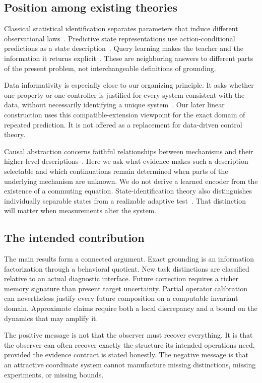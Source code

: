 \subsection{Position among existing theories}
Classical statistical identification separates parameters that induce different observational laws~\cite{GA:rothenberg}. Predictive state representations use action-conditional predictions as a state description~\cite{GA:psr}. Query learning makes the teacher and the information it returns explicit~\cite{GA:angluin}. These are neighboring answers to different parts of the present problem, not interchangeable definitions of grounding.

Data informativity is especially close to our organizing principle. It asks whether one property or one controller is justified for every system consistent with the data, without necessarily identifying a unique system~\cite{GA:informativity}. Our later linear construction uses this compatible-extension viewpoint for the exact domain of repeated prediction. It is not offered as a replacement for data-driven control theory.

Causal abstraction concerns faithful relationships between mechanisms and their higher-level descriptions~\cite{GA:causal}. Here we ask what evidence makes such a description selectable and which continuations remain determined when parts of the underlying mechanism are unknown. We do not derive a learned encoder from the existence of a commuting equation. State-identification theory also distinguishes individually separable states from a realizable adaptive test~\cite{GA:stateid}. That distinction will matter when measurements alter the system.

\subsection{The intended contribution}
The main results form a connected argument. Exact grounding is an information factorization through a behavioral quotient. New task distinctions are classified relative to an actual diagnostic interface. Future correction requires a richer memory signature than present target uncertainty. Partial operator calibration can nevertheless justify every future composition on a computable invariant domain. Approximate claims require both a local discrepancy and a bound on the dynamics that may amplify it.

The positive message is not that the observer must recover everything. It is that the observer can often recover exactly the structure its intended operations need, provided the evidence contract is stated honestly. The negative message is that an attractive coordinate system cannot manufacture missing distinctions, missing experiments, or missing bounds.

